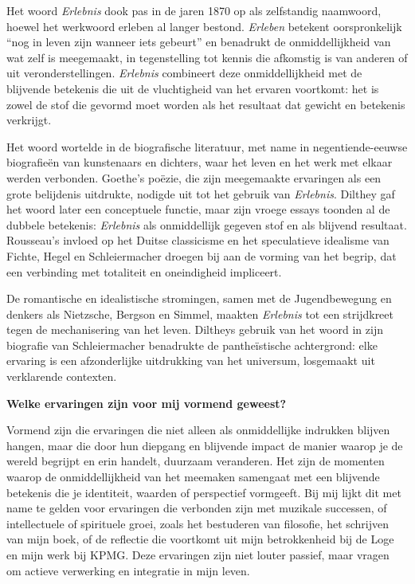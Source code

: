\documentclass[11pt,twoside,openright]{memoir}
\begin{document}
Het woord \textit{Erlebnis} dook pas in de jaren 1870 op als zelfstandig naamwoord, hoewel het werkwoord erleben al langer bestond. \textit{Erleben} betekent oorspronkelijk ``nog in leven zijn wanneer iets gebeurt'' en benadrukt de onmiddellijkheid van wat zelf is meegemaakt, in tegenstelling tot kennis die afkomstig is van anderen of uit veronderstellingen. \textit{Erlebnis} combineert deze onmiddellijkheid met de blijvende betekenis die uit de vluchtigheid van het ervaren voortkomt: het is zowel de stof die gevormd moet worden als het resultaat dat gewicht en betekenis verkrijgt.

Het woord wortelde in de biografische literatuur, met name in negentiende-eeuwse biografieën van kunstenaars en dichters, waar het leven en het werk met elkaar werden verbonden. Goethe’s poëzie, die zijn meegemaakte ervaringen als een grote belijdenis uitdrukte, nodigde uit tot het gebruik van \textit{Erlebnis}. Dilthey gaf het woord later een conceptuele functie, maar zijn vroege essays toonden al de dubbele betekenis: \textit{Erlebnis} als onmiddellijk gegeven stof en als blijvend resultaat. Rousseau’s invloed op het Duitse classicisme en het speculatieve idealisme van Fichte, Hegel en Schleiermacher droegen bij aan de vorming van het begrip, dat een verbinding met totaliteit en oneindigheid impliceert.

De romantische en idealistische stromingen, samen met de Jugendbewegung en denkers als Nietzsche, Bergson en Simmel, maakten \textit{Erlebnis} tot een strijdkreet tegen de mechanisering van het leven. Diltheys gebruik van het woord in zijn biografie van Schleiermacher benadrukte de pantheïstische achtergrond: elke ervaring is een afzonderlijke uitdrukking van het universum, losgemaakt uit verklarende contexten.

\bigskip
\noindent
\textbf{Welke ervaringen zijn voor mij vormend geweest?}
\medskip

Vormend zijn die ervaringen die niet alleen als onmiddellijke indrukken blijven hangen, maar die door hun diepgang en blijvende impact de manier waarop je de wereld begrijpt en erin handelt, duurzaam veranderen. Het zijn de momenten waarop de onmiddellijkheid van het meemaken samengaat met een blijvende betekenis die je identiteit, waarden of perspectief vormgeeft. Bij mij lijkt dit met name te gelden voor ervaringen die verbonden zijn met muzikale successen, of intellectuele of spirituele groei, zoals het bestuderen van filosofie, het schrijven van mijn boek, of de reflectie die voortkomt uit mijn betrokkenheid bij de Loge en mijn werk bij KPMG. Deze ervaringen zijn niet louter passief, maar vragen om actieve verwerking en integratie in mijn leven.
\end{document}
